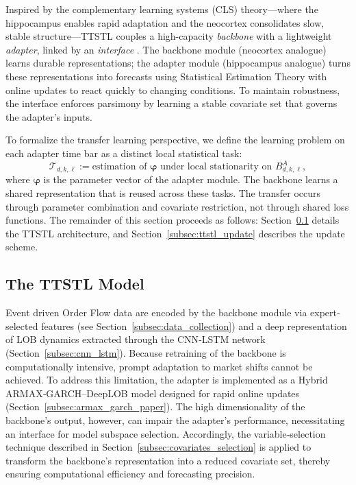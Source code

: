 \documentclass[10pt,a4paper,oneside]{article}
\begin{document}
Inspired by the complementary learning systems (CLS) theory—where the hippocampus enables rapid adaptation and the neocortex consolidates slow, stable structure—TTSTL couples a high-capacity \emph{backbone} with a lightweight \emph{adapter}, linked by an \emph{interface} \cite{pham_continual_2024}. The backbone module (neocortex analogue) learns durable representations; the adapter module (hippocampus analogue) turns these representations into forecasts using Statistical Estimation Theory with online updates to react quickly to changing conditions. To maintain robustness, the interface enforces parsimony by learning a stable covariate set that governs the adapter’s inputs.

To formalize the transfer learning perspective, we define the learning problem on each adapter time bar as a distinct local statistical task:
\[
\mathcal{T}_{d,k,\ell} := \text{estimation of } \boldsymbol{\varphi} \text{ under local stationarity on } B^A_{d,k,\ell},
\]
where $\boldsymbol{\varphi}$ is the parameter vector of the adapter module. The backbone learns a shared representation that is reused across these tasks. The transfer occurs through parameter combination and covariate restriction, not through shared loss functions. The remainder of this section proceeds as follows: Section~\ref{subsec:ttstl_model} details the TTSTL architecture, and Section~\ref{subsec:ttstl_update} describes the update scheme.

\subsection{The TTSTL Model}
\label{subsec:ttstl_model}

Event driven Order Flow data are encoded by the backbone module via expert‐selected features (see Section~\ref{subsec:data_collection}) and a deep representation of LOB dynamics extracted through the CNN‐LSTM network (Section~\ref{subsec:cnn_lstm}).  Because retraining of the backbone is computationally intensive, prompt adaptation to market shifts cannot be achieved.  To address this limitation, the adapter is implemented as a Hybrid ARMAX‐GARCH–DeepLOB model designed for rapid online updates (Section~\ref{subsec:armax_garch_paper}).  The high dimensionality of the backbone’s output, however, can impair the adapter’s performance, necessitating an interface for model subspace selection.  Accordingly, the variable‐selection technique described in Section~\ref{subsec:covariates_selection} is applied to transform the backbone’s representation into a reduced covariate set, thereby ensuring computational efficiency and forecasting precision.
\end{document}
